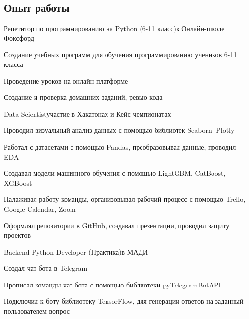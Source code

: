 \documentclass{article}
\begin{document}
    \begin{minipage}{0.7125\textwidth} %
        \begin{tcolorbox}[height=0.8\textheight, grow to left by=0.55cm,colframe=white,colback=white]

            \subsection*{\Large{Опыт работы}}

            {Репетитор по программированию на Python (6-11 класс)}{в Онлайн-школе Фоксфорд}
            {\begin{compactitem}[-]
                \item Создание учебных программ для обучения программированию учеников 6-11 класса
                \item Проведение уроков на онлайн-платформе
                \item Создание и проверка домашних заданий, ревью кода
            \end{compactitem}
            }

            {Data Scientist}{участие в Хакатонах и Кейс-чемпионатах}
            {\begin{compactitem}[-]
                \item Проводил визуальный анализ данных с помощью библиотек Seaborn, Plotly
                \item Работал с датасетами с помощью Pandas, преобразовывал данные, проводил EDA               
                \item Создавал модели машинного обучения с помощью LightGBM, CatBoost, XGBoost
                \item Налаживал работу команды, организовывал рабочий процесс с помощью Trello, Google Calendar, Zoom
                \item Оформлял репозитории в GitHub, создавал презентации, проводил защиту проектов
            \end{compactitem}
            }

            {Backend Python Developer (Практика)}{в МАДИ}
            {\begin{compactitem}[-]
                \item Создал чат-бота в Telegram
                \item Прописал команды чат-бота с помощью библиотеки pyTelegramBotAPI
                \item Подключил к боту библиотеку TensorFlow, для генерации ответов на заданный пользователем вопрос
            \end{compactitem}
            }
            

\end{tcolorbox}
\end{minipage}
\end{document}
